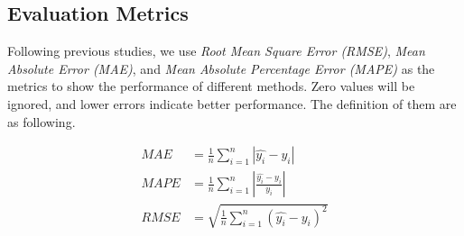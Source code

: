 \subsection{Evaluation Metrics}
Following previous studies, we use \textit{Root Mean Square Error (RMSE)}, \textit{Mean Absolute Error (MAE)}, and \textit{Mean Absolute Percentage Error (MAPE)} as the metrics to show the performance of different methods. Zero values will be ignored, and lower errors indicate better performance. The definition of them are as following.

\begin{equation}
    \begin{aligned}
        MAE&=\frac 1n\sum_{i=1}^n|\hat{y_i}-y_i|\\
        MAPE&=\frac 1n\sum_{i=1}^n|\frac{\hat{y_i}-y_i}{y_i}|\\
        RMSE&=\sqrt{\frac 1n\sum_{i=1}^n(\hat{y_i}-y_i)^2}
    \end{aligned}
\end{equation}

